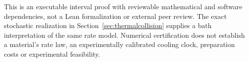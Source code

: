 This is an executable interval proof with reviewable mathematical and
software dependencies, not a Lean formalization or external peer review.
The exact stochastic realization in Section~\ref{sec:thermalcollision}
supplies a bath interpretation of the same rate model. Numerical
certification does not establish a material's rate law, an experimentally
calibrated cooling clock, preparation costs or experimental feasibility.
